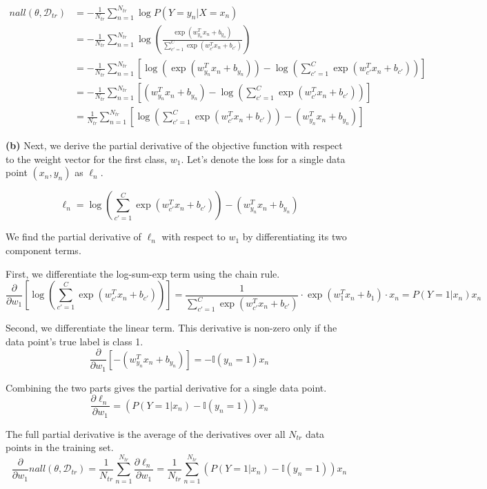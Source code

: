 \documentclass[11pt]{article}
\begin{document}
\begin{align*}
nall(\theta, \mathcal{D}_{tr}) &= -\frac{1}{N_{tr}} \sum_{n=1}^{N_{tr}} \log P(Y=y_n | X=x_n) \\
&= -\frac{1}{N_{tr}} \sum_{n=1}^{N_{tr}} \log \left( \frac{\exp(w_{y_n}^T x_n + b_{y_n})}{\sum_{c'=1}^C \exp(w_{c'}^T x_n + b_{c'})} \right) \quad \\
&= -\frac{1}{N_{tr}} \sum_{n=1}^{N_{tr}} \left[ \log(\exp(w_{y_n}^T x_n + b_{y_n})) - \log\left(\sum_{c'=1}^C \exp(w_{c'}^T x_n + b_{c'})\right) \right] \quad  \\
&= -\frac{1}{N_{tr}} \sum_{n=1}^{N_{tr}} \left[ (w_{y_n}^T x_n + b_{y_n}) - \log\left(\sum_{c'=1}^C \exp(w_{c'}^T x_n + b_{c'})\right) \right] \quad  \\
&= \frac{1}{N_{tr}} \sum_{n=1}^{N_{tr}} \left[ \log\left(\sum_{c'=1}^C \exp(w_{c'}^T x_n + b_{c'})\right) - (w_{y_n}^T x_n + b_{y_n}) \right] \quad 
\end{align*}

\noindent\textbf{(b)} Next, we derive the partial derivative of the objective function with respect to the weight vector for the first class, $w_1$. Let's denote the loss for a single data point $(x_n, y_n)$ as $\ell_n$.

\[
\ell_n = \log\left(\sum_{c'=1}^C \exp(w_{c'}^T x_n + b_{c'})\right) - (w_{y_n}^T x_n + b_{y_n})
\]

We find the partial derivative of $\ell_n$ with respect to $w_1$ by differentiating its two component terms.

\noindent First, we differentiate the log-sum-exp term using the chain rule.
\[
\frac{\partial}{\partial w_1} \left[ \log\left(\sum_{c'=1}^C \exp(w_{c'}^T x_n + b_{c'})\right) \right] = \frac{1}{\sum_{c'=1}^C \exp(w_{c'}^T x_n + b_{c'})} \cdot \exp(w_1^T x_n + b_1) \cdot x_n = P(Y=1|x_n) x_n
\]

\noindent Second, we differentiate the linear term. This derivative is non-zero only if the data point's true label is class 1.
\[
\frac{\partial}{\partial w_1} \left[ -(w_{y_n}^T x_n + b_{y_n}) \right] = -\mathbb{I}(y_n=1) x_n
\]

\noindent Combining the two parts gives the partial derivative for a single data point.
\[
\frac{\partial \ell_n}{\partial w_1} = (P(Y=1|x_n) - \mathbb{I}(y_n=1)) x_n
\]

\noindent The full partial derivative is the average of the derivatives over all $N_{tr}$ data points in the training set.
\[
\frac{\partial}{\partial w_1} nall(\theta, \mathcal{D}_{tr}) = \frac{1}{N_{tr}} \sum_{n=1}^{N_{tr}} \frac{\partial \ell_n}{\partial w_1} = \frac{1}{N_{tr}} \sum_{n=1}^{N_{tr}} \left( P(Y=1|x_n) - \mathbb{I}(y_n=1) \right) x_n
\]
\end{document}
